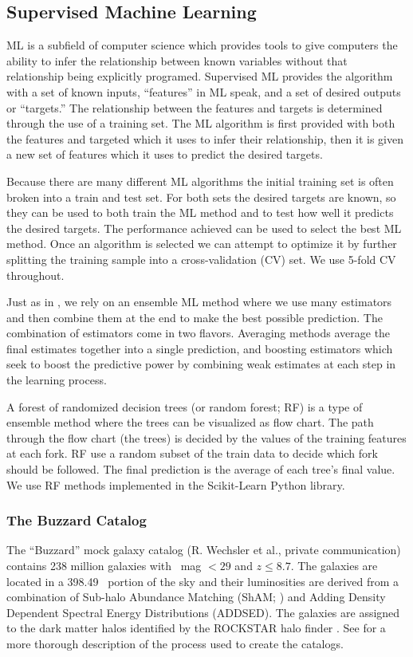 \subsection{Supervised Machine Learning}
ML is a subfield of computer science which provides tools to give computers the ability to infer the relationship between known variables without that relationship being explicitly programed. Supervised ML provides the algorithm with a set of known inputs, ``features'' in ML speak, and a set of desired outputs or ``targets.'' The relationship between the features and targets is determined through the use of a training set. The ML algorithm is first provided with both the features and targeted which it uses to infer their relationship, then it is given a new set of features which it uses to predict the desired targets. 

Because there are many different ML algorithms the initial training set is often broken into a train and test set. For both sets the desired targets are known, so they can be used to both train the ML method and to test how well it predicts the desired targets. The performance achieved can be used to select the best ML method. Once an algorithm is selected we can attempt to optimize it by further splitting the training sample into a cross-validation (CV) set. We use 5-fold CV throughout.

Just as in , we rely on an ensemble ML method where we use many estimators and then combine them at the end to make the best possible prediction. The combination of estimators come in two flavors. Averaging methods average the final estimates together into a single prediction, and boosting estimators which seek to boost the predictive power by combining weak estimates at each step in the learning process.

A forest of randomized decision trees (or random forest; RF) is a type of ensemble method where the trees can be visualized as flow chart. The path through the flow chart (the trees) is decided by the values of the training features at each fork. RF use a random subset of the train data to decide which fork should be followed. The final prediction is the average of each tree's final value. We use RF methods implemented in the {\sc Scikit-Learn} \citep{Pedregosa2012} Python library.

\subsubsection{The Buzzard Catalog}
The ``Buzzard'' mock galaxy catalog (R. Wechsler et al., private communication) contains 238 million galaxies with \sdssr\ mag $< 29$ and $z \leq 8.7$. The galaxies are located in a 398.49 \degsq\ portion of the sky and their luminosities are derived from a combination of Sub-halo Abundance Matching (ShAM; \citealt{Reddick2013}) and Adding Density Dependent Spectral Energy Distributions (ADDSED). The galaxies are assigned to the dark matter halos identified by the {\sc ROCKSTAR} halo finder \citep{Behroozi2013}. See  for a more thorough description of the process used to create the catalogs.

